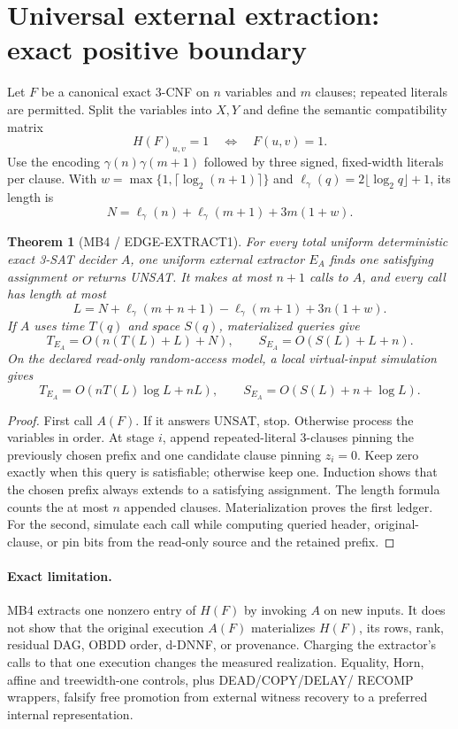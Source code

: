 \documentclass[11pt]{article}
\newtheorem{theorem}{Theorem}
\begin{document}
\section{Universal external extraction: exact positive boundary}

Let $F$ be a canonical exact 3-CNF on $n$ variables and $m$ clauses;
repeated literals are permitted.  Split the variables into $X,Y$ and define
the semantic compatibility matrix
\[
 H(F)_{u,v}=1\quad\Longleftrightarrow\quad F(u,v)=1.
\]
Use the encoding $\gamma(n)\gamma(m+1)$ followed by three signed,
fixed-width literals per clause.  With
$w=\max\{1,\lceil\log_2(n+1)\rceil\}$ and
$\ell_\gamma(q)=2\lfloor\log_2q\rfloor+1$, its length is
\[
 N=\ell_\gamma(n)+\ell_\gamma(m+1)+3m(1+w).
\]

\begin{theorem}[MB4 / EDGE-EXTRACT1]
For every total uniform deterministic exact 3-SAT decider $A$, one uniform
external extractor $E_A$ finds one satisfying assignment or returns UNSAT.
It makes at most $n+1$ calls to $A$, and every call has length at most
\[
 L=N+\ell_\gamma(m+n+1)-\ell_\gamma(m+1)+3n(1+w).
\]
If $A$ uses time $T(q)$ and space $S(q)$, materialized queries give
\[
 T_{E_A}=O(n(T(L)+L)+N),\qquad S_{E_A}=O(S(L)+L+n).
\]
On the declared read-only random-access model, a local virtual-input
simulation gives
\[
 T_{E_A}=O(nT(L)\log L+nL),\qquad
 S_{E_A}=O(S(L)+n+\log L).
\]
\end{theorem}

\begin{proof}
First call $A(F)$.  If it answers UNSAT, stop.  Otherwise process the
variables in order.  At stage $i$, append repeated-literal 3-clauses pinning
the previously chosen prefix and one candidate clause pinning $z_i=0$.
Keep zero exactly when this query is satisfiable; otherwise keep one.
Induction shows that the chosen prefix always extends to a satisfying
assignment.  The length formula counts the at most $n$ appended clauses.
Materialization proves the first ledger.  For the second, simulate each call
while computing queried header, original-clause, or pin bits from the
read-only source and the retained prefix.
\end{proof}

\paragraph{Exact limitation.}
MB4 extracts one nonzero entry of $H(F)$ by invoking $A$ on new inputs.  It
does not show that the original execution $A(F)$ materializes $H(F)$, its
rows, rank, residual DAG, OBDD order, d-DNNF, or provenance.  Charging the
extractor's calls to that one execution changes the measured realization.
Equality, Horn, affine and treewidth-one controls, plus DEAD/COPY/DELAY/
RECOMP wrappers, falsify free promotion from external witness recovery to a
preferred internal representation.
\end{document}
